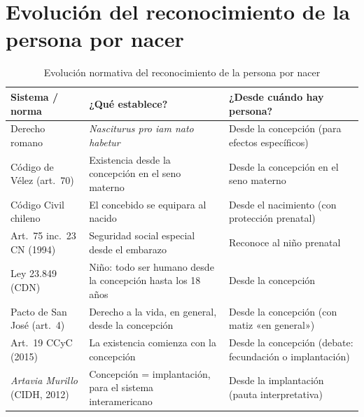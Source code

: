 \documentclass[12pt,oneside]{book}
\begin{document}
\section{Evolución del reconocimiento de la persona por nacer}

\begin{table}[H]
\centering
\small
\begin{tabularx}{\textwidth}{B{0.23\textwidth} Y B{0.26\textwidth}}
\toprule
\textbf{Sistema / norma} & \textbf{¿Qué establece?} & \textbf{¿Desde cuándo hay persona?} \\
\midrule
Derecho romano & \textit{Nasciturus pro iam nato habetur} & Desde la concepción (para efectos específicos) \\
Código de Vélez (art.~70) & Existencia desde la concepción en el seno materno & Desde la concepción en el seno materno \\
Código Civil chileno & El concebido se equipara al nacido & Desde el nacimiento (con protección prenatal) \\
Art.~75 inc.~23 CN (1994) & Seguridad social especial desde el embarazo & Reconoce al niño prenatal \\
Ley 23.849 (CDN) & Niño: todo ser humano desde la concepción hasta los 18 años & Desde la concepción \\
Pacto de San José (art.~4) & Derecho a la vida, en general, desde la concepción & Desde la concepción (con matiz «en general») \\
Art.~19 CCyC (2015) & La existencia comienza con la concepción & Desde la concepción (debate: fecundación o implantación) \\
\textit{Artavia Murillo} (CIDH, 2012) & Concepción = implantación, para el sistema interamericano & Desde la implantación (pauta interpretativa) \\
\bottomrule
\end{tabularx}
\caption{Evolución normativa del reconocimiento de la persona por nacer}
\end{table}
\end{document}

